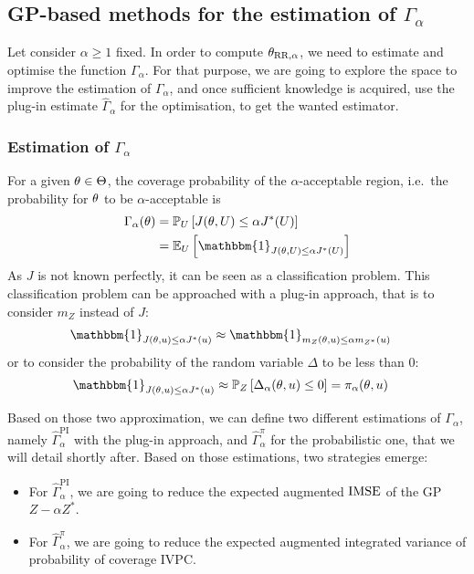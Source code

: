 \documentclass[../../Main_ManuscritThese.tex]{subfiles}
\begin{document}
\subsection{GP-based methods for the estimation of $\Gamma_{\alpha}$}
\label{sec:evaluation_gamma}
Let consider $\alpha\geq 1$ fixed. In order to compute
${\theta}_{\mathrm{RR, \alpha}}$, we need to estimate and optimise the
function $\Gamma_{\alpha}$. For that purpose, we are going to explore
the space to improve the estimation of $\Gamma_{\alpha}$, and once
sufficient knowledge is acquired, use the plug-in %
estimate $\hat{\Gamma}_{\alpha}$ for the optimisation, to get the
wanted estimator.

\subsubsection{Estimation of $\Gamma_{\alpha}$}

For a given $\theta\in\Theta$, the coverage probability of the
$\alpha$-acceptable region, i.e.\ the probability for $\theta$ to be
$\alpha$-acceptable is
\begin{align}
  \Gamma_{\alpha}(\kk)  & = \Prob_{U}\left[J(\kk,\UU) \leq \alpha J^*(\UU)\right] \\
                      & =\Ex_{U}\left[\mathbbm{1}_{J(\kk,\UU) \leq \alpha J^*(\UU)}\right]
\end{align}
As $J$ is not known perfectly, it can be seen as a classification
problem.  This classification problem can be approached with a plug-in
approach, that is to consider $m_Z$ instead of $J$:
\begin{align}
  \mathbbm{1}_{J(\kk,\uu) \leq \alpha J^*(\uu)} & \approx   \mathbbm{1}_{m_Z(\kk,\uu) \leq \alpha m_{{Z^*}}(\uu)} \label{eq:plugin_indicator}
\end{align}
or to consider the probability of the random variable $\Delta$ to be less than $0$:
\begin{align}
  \mathbbm{1}_{J(\kk,\uu) \leq \alpha J^*(\uu)} & \approx   \Prob_{Z}\left[ \Delta_{\alpha}(\kk,\uu) \leq 0 \right] = \pi_{\alpha}(\kk,\uu) \label{eq:prob_indicator}
\end{align}

Based on those two approximation, we can define two different
estimations of $\Gamma_\alpha$, namely
$\hat{\Gamma}_\alpha^{\mathrm{PI}}$ with the plug-in approach, and
$\hat{\Gamma}_{\alpha}^{\pi}$ for the probabilistic one, that we will
detail shortly after. Based on those estimations, two strategies
emerge:
\begin{itemize}
\item For $\hat{\Gamma}_{\alpha}^{\mathrm{PI}}$, we are going to
  reduce the expected augmented $\operatorname{\mathrm{IMSE}}$ of the GP $Z - \alpha Z^*$.
\item For $\hat{\Gamma}_{\alpha}^{\pi}$, we are going to reduce the
  expected augmented integrated variance of probability of coverage
  $\mathrm{IVPC}$.
\end{itemize}
\end{document}
